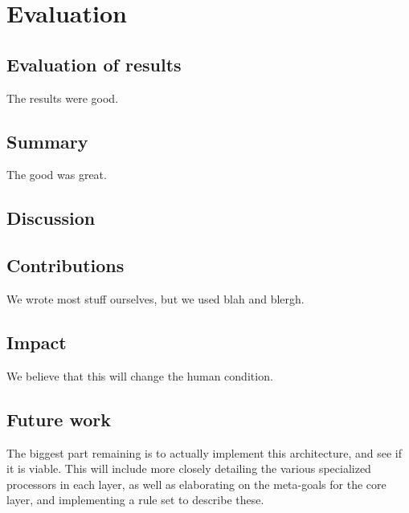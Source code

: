 \chapter{Evaluation}
\section{Evaluation of results}
The results were good.


\section{Summary}
The good was great.


\section{Discussion}


\section{Contributions}
We wrote most stuff ourselves, but we used blah and blergh.


\section{Impact}
We believe that this will change the human condition.


\section{Future work}
The biggest part remaining is to actually implement this architecture, and see
if it is viable. This will include more closely detailing the various
specialized processors in each layer, as well as elaborating on the meta-goals
for the core layer, and implementing a rule set to describe these.